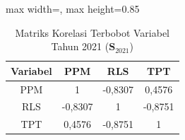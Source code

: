 \begin{table}[H]
\centering
\caption{Matriks Korelasi Terbobot Variabel Tahun 2021 ($\mathbf{S}_{2021}$)} \label{tab:sample1matriks_intra_loading_2021}
\begin{adjustbox}{max width=\textwidth, max height=0.85\textheight}
\begin{tabular}{|c|c|c|c|}
\hline
\textbf{Variabel} & \textbf{PPM} & \textbf{RLS} & \textbf{TPT} \\
\hline
PPM & 1 & -0,8307 & 0,4576 \\
RLS & -0,8307 & 1 & -0,8751 \\
TPT & 0,4576 & -0,8751 & 1 \\
\hline
\end{tabular}
\end{adjustbox}
\end{table}